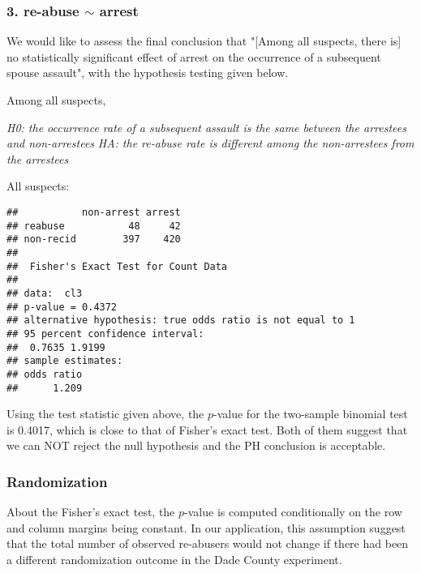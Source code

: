\documentclass{article}\usepackage{graphicx, color}
\makeatletter
\newenvironment{kframe}{%
 \def\at@end@of@kframe{}%
 \ifinner\ifhmode%
  \def\at@end@of@kframe{\end{minipage}}%
  \begin{minipage}{\columnwidth}%
 \fi\fi%
 \def\FrameCommand##1{\hskip\@totalleftmargin \hskip-\fboxsep
 \colorbox{shadecolor}{##1}\hskip-\fboxsep
     \hskip-\linewidth \hskip-\@totalleftmargin \hskip\columnwidth}%
 \MakeFramed {\advance\hsize-\width
   \@totalleftmargin\z@ \linewidth\hsize
   \@setminipage}}%
 {\par\unskip\endMakeFramed%
 \at@end@of@kframe}
\newenvironment{knitrout}{}{} %
\makeatother
\begin{document}
\subsubsection*{3. re-abuse $\sim$ arrest}
\hspace{12 pt} We would like to assess the final conclusion that "[Among
all suspects, there is] no statistically significant effect of arrest
on the occurrence of a subsequent spouse assault", with the hypothesis
testing given below.


Among all suspects,


\hspace{12 pt} \textit{H0: the occurrence rate of a subsequent assault
  is the same between the arrestees and non-arrestees} \newline
\vspace{2 pt}
\hspace{24 pt} \textit{HA: the re-abuse rate is different among the
  non-arrestees from the arrestees} \newline


All suspects:

\begin{knitrout}
\color{fgcolor}\begin{kframe}
\begin{verbatim}
##           non-arrest arrest
## reabuse           48     42
## non-recid        397    420
## 
## 	Fisher's Exact Test for Count Data
## 
## data:  cl3 
## p-value = 0.4372
## alternative hypothesis: true odds ratio is not equal to 1 
## 95 percent confidence interval:
##  0.7635 1.9199 
## sample estimates:
## odds ratio 
##      1.209
\end{verbatim}
\end{kframe}
\end{knitrout}


Using the test statistic given above, the $p$-value for the two-sample
binomial test is 0.4017, which is
close to that of Fisher's exact test. Both of them suggest that we can
NOT reject the null hypothesis and the PH conclusion is acceptable.


\newpage
\subsubsection*{Randomization}
\hspace{12 pt} About the Fisher's exact test, the $p$-value is
computed conditionally on the row and column margins being
constant. In our application, this assumption suggest that the total
number of observed re-abusers would not change if there had been a
different randomization outcome in the Dade County experiment. 
\end{document}
